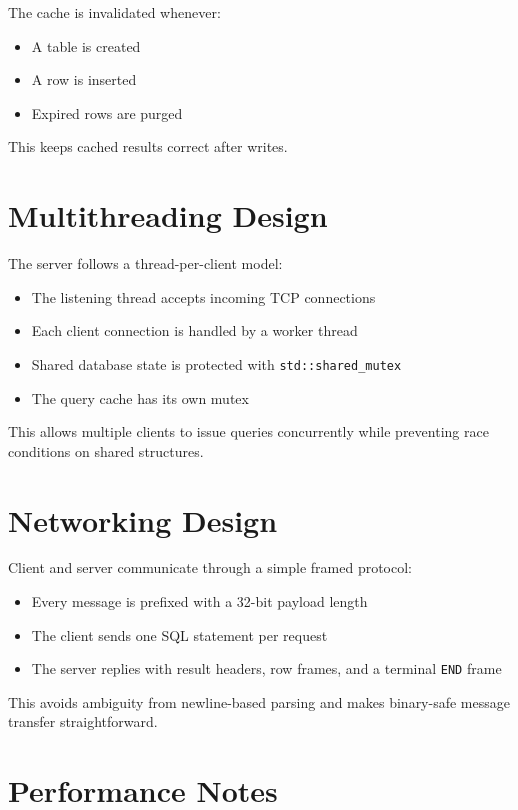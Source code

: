 \documentclass[11pt,a4paper]{article}
\begin{document}
The cache is invalidated whenever:

\begin{itemize}
    \item A table is created
    \item A row is inserted
    \item Expired rows are purged
\end{itemize}

This keeps cached results correct after writes.

\section{Multithreading Design}

The server follows a thread-per-client model:

\begin{itemize}
    \item The listening thread accepts incoming TCP connections
    \item Each client connection is handled by a worker thread
    \item Shared database state is protected with \texttt{std::shared\_mutex}
    \item The query cache has its own mutex
\end{itemize}

This allows multiple clients to issue queries concurrently while preventing race conditions on shared structures.

\section{Networking Design}

Client and server communicate through a simple framed protocol:

\begin{itemize}
    \item Every message is prefixed with a 32-bit payload length
    \item The client sends one SQL statement per request
    \item The server replies with result headers, row frames, and a terminal \texttt{END} frame
\end{itemize}

This avoids ambiguity from newline-based parsing and makes binary-safe message transfer straightforward.

\section{Performance Notes}
\end{document}
